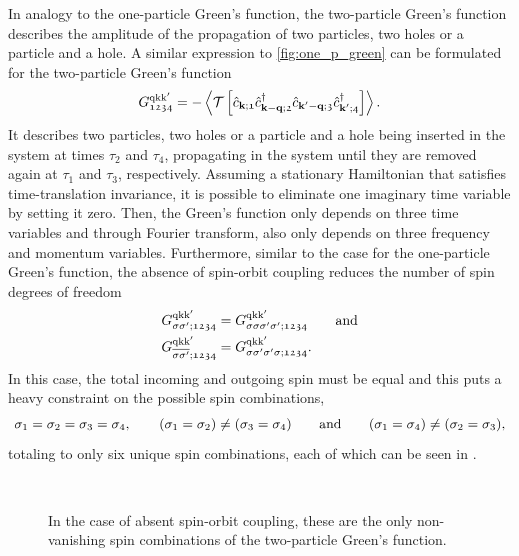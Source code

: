 \documentclass[\main/main.tex]{subfiles}
\begin{document}
In analogy to the one-particle Green's function, the two-particle Green's function describes the amplitude of the propagation of two particles, two holes or a particle and a hole. A similar expression to \eqref{fig:one_p_green} can be formulated for the two-particle Green's function
\begin{align}
	G_{\mathfrak{1234}}^{\text{q}\text{k}\text{k}'}=-\left\langle \mathcal{T}\left [\hat{c}_{\textbf{k};\mathfrak{1}}\hat{c}^{\dagger}_{\textbf{k}-\textbf{q};\mathfrak{2}}\hat{c}_{\textbf{k}'-\textbf{q};\mathfrak{3}}\hat{c}^{\dagger}_{\textbf{k}';\mathfrak{4}}\right ]\right\rangle.
\end{align}
It describes two particles, two holes or a particle and a hole being inserted in the system at times $\tau_2$ and $\tau_4$, propagating in the system until they are removed again at $\tau_1$ and $\tau_3$, respectively. Assuming a stationary Hamiltonian that satisfies time-translation invariance, it is possible to eliminate one imaginary time variable by setting it zero. Then, the Green's function only depends on three time variables and through Fourier transform, also only depends on three frequency and momentum variables. 
Furthermore, similar to the case for the one-particle Green's function, the absence of spin-orbit coupling reduces the number of spin degrees of freedom 
\begin{subequations}
\begin{align}
	G_{\sigma\sigma';\mathfrak{1234}}^{\text{q}\text{k}\text{k}'}&=G_{\sigma\sigma\sigma'\sigma';\mathfrak{1234}}^{\text{q}\text{k}\text{k}'} \qquad\text{and}\\
	G_{\overline{\sigma\sigma'};\mathfrak{1234}}^{\text{q}\text{k}\text{k}'}&=G_{\sigma\sigma'\sigma'\sigma;\mathfrak{1234}}^{\text{q}\text{k}\text{k}'}.
\end{align}
\end{subequations}
In this case, the total incoming and outgoing spin must be equal and this puts a heavy constraint on the possible spin combinations,
\begin{align}
	\sigma_1=\sigma_2=\sigma_3=\sigma_4, \qquad (\sigma_1=\sigma_2) \neq (\sigma_3=\sigma_4)\qquad\text{and}\qquad (\sigma_1=\sigma_4)\neq(\sigma_2=\sigma_3),
\end{align}
totaling to only six unique spin combinations, each of which can be seen in .
\begin{figure}[h]
  \centering
  \vspace{0.5cm}\\
  \caption{In the case of absent spin-orbit coupling, these are the only non-vanishing spin combinations of the two-particle Green's function.}
  \label{fig:two_particle_green_spins}
\end{figure}
\end{document}
